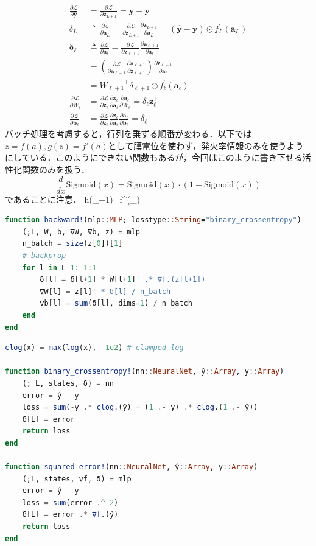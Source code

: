 \begin{align}
\frac{\partial \mathcal{L}}{\partial \hat{\mathbf{y}}}&=\frac{\partial \mathcal{L}}{\partial \mathbf{z}_{L+1}}=\hat{\mathbf{y}}-\mathbf{y}\\
\delta_L&\triangleq\frac{\partial \mathcal{L}}{\partial \mathbf{a}_L}=\frac{\partial \mathcal{L}}{\partial \mathbf{z}_{L+1}} \frac{\partial \mathbf{z}_{L+1}}{\partial \mathbf{a}_L}=\left(\hat{\mathbf{y}}-\mathbf{y}\right) \odot f_L^{\prime}\left(\mathbf{a}_L\right)\\
\mathbf{\delta}_\ell&\triangleq\frac{\partial \mathcal{L}}{\partial \mathbf{a}_{\ell}}=\frac{\partial \mathcal{L}}{\partial \mathbf{z}_{\ell+1}} \frac{\partial \mathbf{z}_{\ell+1}}{\partial \mathbf{a}_\ell}\\
&=\left(\frac{\partial \mathcal{L}}{\partial \mathbf{a}_{\ell+1}}\frac{\partial \mathbf{a}_{\ell+1}}{\partial \mathbf{z}_{\ell+1}}\right)\frac{\partial \mathbf{z}_{\ell+1}}{\partial \mathbf{a}_{\ell}}\\
&={W_{\ell+1}}^\top \delta_{\ell+1} \odot f_\ell^{\prime}\left(\mathbf{a}_{\ell}\right)\\
\frac{\partial \mathcal{L}}{\partial W_\ell}&=\frac{\partial \mathcal{L}}{\partial \mathbf{z}_\ell} \frac{\partial \mathbf{z}_\ell}{\partial \mathbf{a}_\ell} \frac{\partial \mathbf{a}_\ell}{\partial W_\ell}=\delta_\ell \mathbf{z}_\ell^\top\\
\frac{\partial \mathcal{L}}{\partial \mathbf{b}_\ell}&=\frac{\partial \mathcal{L}}{\partial \mathbf{z}_\ell} \frac{\partial \mathbf{z}_\ell}{\partial \mathbf{a}_\ell} \frac{\partial \mathbf{a}_\ell}{\partial \mathbf{b}_\ell}=\delta_\ell
\end{align}
バッチ処理を考慮すると，行列を乗ずる順番が変わる．以下では$z=f(a), g(z)=f'(a)$として膜電位を使わず，発火率情報のみを使うようにしている．このようにできない関数もあるが，今回はこのように書き下せる活性化関数のみを扱う．
\begin{equation}
\frac{d}{dx} \text{Sigmoid}(x) = \text{Sigmoid}(x) \cdot \left(1 - \text{Sigmoid}(x)\right)
\end{equation}
であることに注意．
h\left(_{\ell+1}\right)=f^{\prime}\left(_{\ell}\right)
\begin{lstlisting}[language=julia]
function backward!(mlp::MLP; losstype::String="binary_crossentropy")
    (;L, W, b, ∇W, ∇b, z) = mlp
    n_batch = size(z[0])[1]
    # backprop
    for l in L-1:-1:1
        δ[l] = δ[l+1] * W[l+1]' .* ∇f.(z[l+1])
        ∇W[l] = z[l]' * δ[l] / n_batch
        ∇b[l] = sum(δ[l], dims=1) / n_batch
    end
end
\end{lstlisting}
\begin{lstlisting}[language=julia]
clog(x) = max(log(x), -1e2) # clamped log

function binary_crossentropy!(nn::NeuralNet, ŷ::Array, y::Array)
    (; L, states, δ) = nn
    error = ŷ - y
    loss = sum(-y .* clog.(ŷ) + (1 .- y) .* clog.(1 .- ŷ))
    δ[L] = error
    return loss
end

function squared_error!(nn::NeuralNet, ŷ::Array, y::Array)
    (;L, states, ∇f, δ) = mlp
    error = ŷ - y
    loss = sum(error .^ 2)
    δ[L] = error .* ∇f.(ŷ)
    return loss
end
\end{lstlisting}
